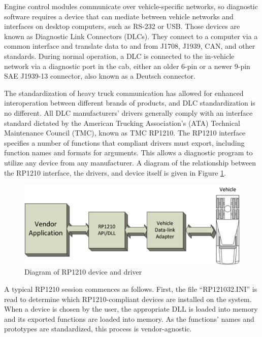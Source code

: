 
Engine control modules communicate over vehicle-specific networks, so diagnostic software requires a device that can mediate between
vehicle networks and interfaces on desktop computers, such as RS-232 or USB. Those devices are known as Diagnostic Link Connectors (DLCs).
They connect to a computer via a common interface and translate data to and from J1708, J1939, CAN, and other standards. During normal
operation, a DLC is connected to the in-vehicle network via a diagnostic port in the cab, either an older 6-pin or a newer 9-pin SAE J1939-13 connector\cite{J1939-13},
also known as a Deutsch connector.

The standardization of heavy truck communication has allowed for enhanced interoperation between different brands of products, and DLC
standardization is no different. All DLC manufacturers' drivers generally comply with an interface standard dictated by the American Trucking Association's (ATA)
Technical Maintenance Council (TMC), known as TMC RP1210\cite{RP1210}. The RP1210 interface specifies a number of functions that compliant drivers must export,
including function names and formats for arguments. This allows a diagnostic program to utilize any device from any manufacturer. A diagram of the relationship between
the RP1210 interface, the drivers, and device itself is given in Figure \ref{fig:rp1210}.

\begin{figure}[h]
  \centering
  \includegraphics{RP1210}
  \caption{Diagram of RP1210 device and driver}
  \label{fig:rp1210}
\end{figure}


A typical RP1210 session commences as follows. First, the file ``RP121032.INI'' is read to determine which RP1210-compliant devices are installed
on the system. When a device is chosen by the user, the appropriate DLL is loaded into memory and its exported functions are loaded into memory.
As the functions' names and prototypes are standardized, this process is vendor-agnostic.

